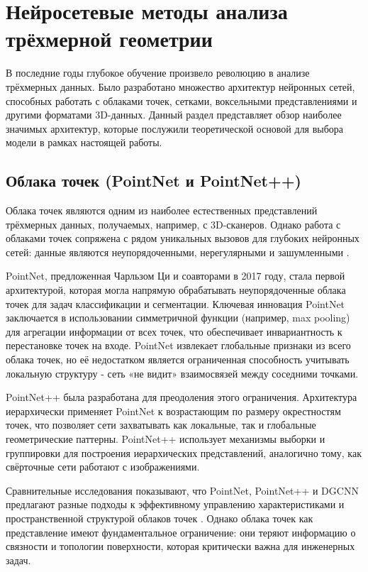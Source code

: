 
\section{Нейросетевые методы анализа трёхмерной геометрии}

В последние годы глубокое обучение произвело революцию в анализе трёхмерных данных. Было разработано множество архитектур нейронных сетей, способных работать с облаками точек, сетками, воксельными представлениями и другими форматами 3D-данных. Данный раздел представляет обзор наиболее значимых архитектур, которые послужили теоретической основой для выбора модели в рамках настоящей работы.

\subsection{Облака точек (PointNet и PointNet++)}

Облака точек являются одним из наиболее естественных представлений трёхмерных данных, получаемых, например, с 3D-сканеров. Однако работа с облаками точек сопряжена с рядом уникальных вызовов для глубоких нейронных сетей: данные являются неупорядоченными, нерегулярными и зашумленными \cite{sarker2024}.

PointNet, предложенная Чарльзом Ци и соавторами в 2017 году, стала первой архитектурой, которая могла напрямую обрабатывать неупорядоченные облака точек для задач классификации и сегментации. Ключевая инновация PointNet заключается в использовании симметричной функции (например, max pooling) для агрегации информации от всех точек, что обеспечивает инвариантность к перестановке точек на входе. PointNet извлекает глобальные признаки из всего облака точек, но её недостатком является ограниченная способность учитывать локальную структуру - сеть «не видит» взаимосвязей между соседними точками.

PointNet++ была разработана для преодоления этого ограничения. Архитектура иерархически применяет PointNet к возрастающим по размеру окрестностям точек, что позволяет сети захватывать как локальные, так и глобальные геометрические паттерны. PointNet++ использует механизмы выборки и группировки для построения иерархических представлений, аналогично тому, как свёрточные сети работают с изображениями.

Сравнительные исследования показывают, что PointNet, PointNet++ и DGCNN предлагают разные подходы к эффективному управлению характеристиками и пространственной структурой облаков точек \cite{kang2024}. Однако облака точек как представление имеют фундаментальное ограничение: они теряют информацию о связности и топологии поверхности, которая критически важна для инженерных задач.

